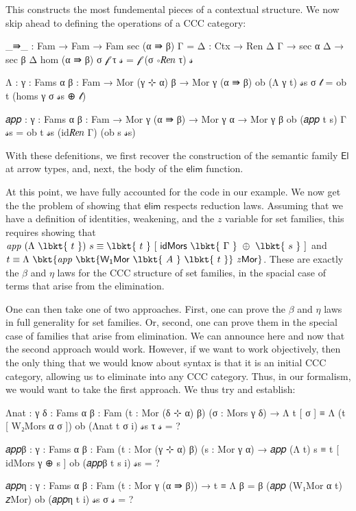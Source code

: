 This constructs the most fundemental pieces of a contextual structure. We now
skip ahead to defining the operations of a CCC category:
\begin{code}
_⇛_ : Fam → Fam → Fam
sec (α ⇛ β) Γ = {Δ : Ctx} → Ren Δ Γ → sec α Δ → sec β Δ
hom (α ⇛ β) σ 𝒻 τ 𝓈 = 𝒻 (σ ∘𝑅𝑒𝑛 τ) 𝓈

Λ : {γ : Fams} {α β : Fam} → Mor (γ ⊹ α) β → Mor γ (α ⇛ β)
ob (Λ {γ} t) 𝓈s σ 𝓉 = ob t (homs γ σ 𝓈s ⊕ 𝓉)

𝑎𝑝𝑝 : {γ : Fams} {α β : Fam} → Mor γ (α ⇛ β) → Mor γ α → Mor γ β
ob (𝑎𝑝𝑝 t s) {Γ} 𝓈s = ob t 𝓈s (id𝑅𝑒𝑛 Γ) (ob s 𝓈s)
\end{code}
With these defenitions, we first recover the construction of the semantic
family $\mathsf{El}$ at arrow types, and, next, the body of the $\mathsf{elim}$
function.

At this point, we have fully accounted for the code in our example. We now
get the the problem of showing that $\mathsf{elim}$ respects reduction laws.
Assuming that we have a definition of identities, weakening, and the
$\mathit{z}$ variable for set families, this requires showing that $\mathit{app}
~(\Lambda~\lbkt{~t~})~s \equiv \lbkt{~t~}~[~\mathsf{idMors}~\lbkt{~\Gamma~}~
\oplus~\lbkt{~s~}~]$ and $t \equiv \Lambda~\bkt{\mathit{app}~\bkt{
\mathsf{W_1Mor}~\lbkt{~A~}~\lbkt{~t~}}~ \mathit{z}\mathsf{Mor}}$. These are
exactly the $\beta$ and $\eta$ laws for the CCC structure of set families,
in the spacial case of terms that arise from the elimination.

One can then take one of two approaches. First, one can prove the $\beta$ and
$\eta$ laws in full generality for set families. Or, second, one can prove them
in the special case of families that arise from elimination. We can announce
here and now that the second approach would work. However, if we want to
work objectively, then the only thing that we would know about syntax is that
it is an initial CCC category, allowing us to eliminate into any CCC category.
Thus, in our formalism, we would want to take the first approach. We thus try
and establish:
\begin{code}
Λnat : {γ δ : Fams} {α β : Fam} (t : Mor (δ ⊹ α) β) (σ : Mors γ δ) →
  Λ t [ σ ] ≡ Λ (t [ W₂Mors α σ ])
ob (Λnat t σ i) 𝓈s τ 𝓈 = ?


𝑎𝑝𝑝β : {γ : Fams} {α β : Fam} (t : Mor (γ ⊹ α) β) (s : Mor γ α) →
  𝑎𝑝𝑝 (Λ t) s ≡ t [ idMors γ ⊕ s ]
ob (𝑎𝑝𝑝β t s i) 𝓈s = ?

𝑎𝑝𝑝η : {γ : Fams} {α β : Fam} (t : Mor γ (α ⇛ β)) →
  t ≡ Λ {β = β} (𝑎𝑝𝑝 (W₁Mor α t) 𝑧Mor)
ob (𝑎𝑝𝑝η t i) 𝓈s σ 𝓈 = ?
\end{code}

